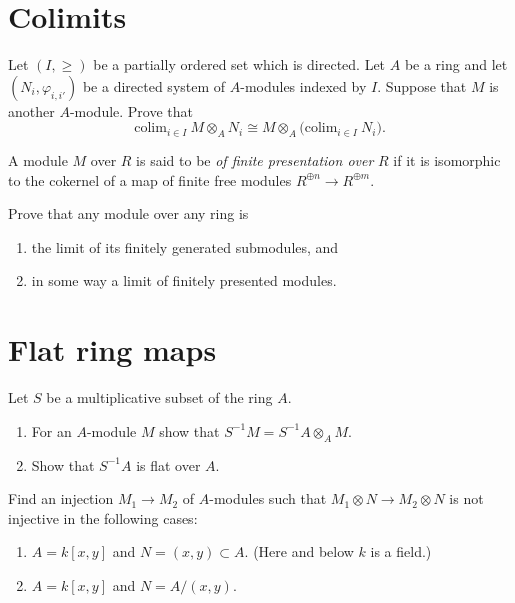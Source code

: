 \section{Colimits}
\label{section-colimits}

\begin{exercise}
Let $(I, \geq)$ be a partially ordered set which is directed.
Let $A$ be a ring and let $(N_i,\varphi_{i,i'})$ be a directed system of
$A$-modules indexed by $I$. Suppose that $M$ is another $A$-module. Prove
that 
$$
\text{colim}_{i\in I}\ M\otimes_A N_i\cong
M\otimes_A \Big( \text{colim}_{i\in I}\ N_i\Big).
$$
\end{exercise}

\begin{definition}
A module $M$ over $R$ is said to be {\it of finite presentation over}
$R$ if it  is isomorphic to the cokernel of a map of finite free modules
$ R^{\oplus n} \to R^{\oplus m}$.
\end{definition}

\begin{exercise}
Prove that any module over any ring is 
\begin{enumerate}
\item the limit of its finitely generated
submodules, and
\item in some way a limit of finitely presented modules.
\end{enumerate}
\end{exercise}








\section{Flat ring maps}
\label{section-flat}

\begin{exercise}
Let $S$ be a multiplicative subset of the ring $A$.
\begin{enumerate}
\item For an $A$-module $M$ show that $S^{-1}M = S^{-1}A\otimes_A M$.
\item Show that $S^{-1}A$ is flat over $A$.
\end{enumerate}
\end{exercise}

\begin{exercise}
Find an injection $M_1 \to M_2$ of $A$-modules such that
$M_1\otimes N \to M_2 \otimes N$ is not injective in the following
cases:
\begin{enumerate}
\item $A=k[x,y]$ and $N=(x,y) \subset A$. (Here and below $k$ is a field.)
\item $A=k[x,y]$ and $N=A/(x,y)$.
\end{enumerate}
\end{exercise}


